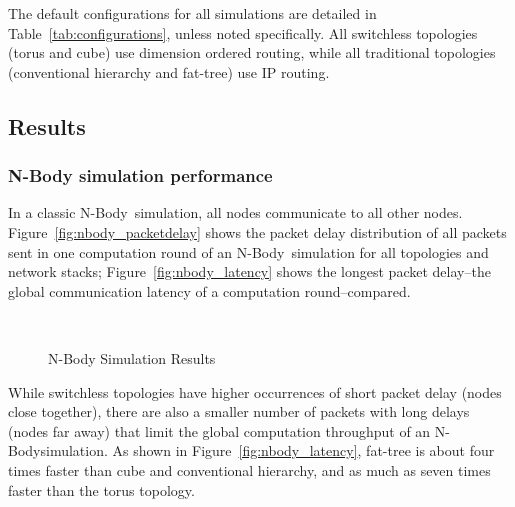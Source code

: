 The default configurations for all simulations are detailed in Table~\ref{tab:configurations}, unless noted specifically.  All switchless topologies (torus and cube) use dimension ordered routing, while all traditional topologies (conventional hierarchy and fat-tree) use IP routing.

\subsection {Results}


\subsubsection{N-Body simulation performance}
\newcommand{\nbody}{N-Body}
In a classic \nbody~simulation, all nodes communicate to all other nodes. Figure~\ref{fig:nbody_packetdelay} shows the packet delay distribution of all packets sent in one computation round of an \nbody~simulation for all topologies and network stacks; Figure~\ref{fig:nbody_latency} shows the longest packet delay--the global communication latency of a computation round--compared.

\captionsetup[subfloat]{captionskip=-0.003in}
\begin{figure}
    \centering
    \\
    \vspace{-0.1in}
    \vspace{-0.07in}
    \caption{N-Body Simulation Results}
    \label{fig:common_topos}
\end{figure}

While switchless topologies have higher occurrences of short packet delay (nodes close together), there are also a smaller number of packets with long delays (nodes far away) that limit the global computation throughput of an \nbody simulation. As shown in Figure~\ref{fig:nbody_latency}, fat-tree is about four times faster than cube and conventional hierarchy, and as much as seven times faster than the torus topology.

